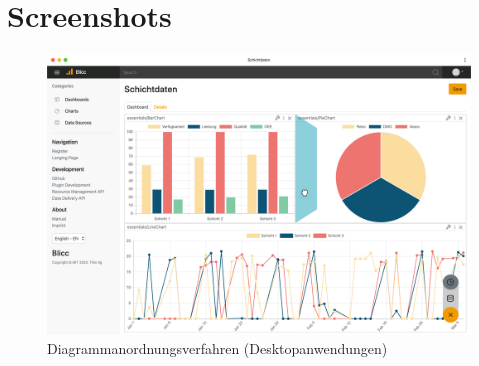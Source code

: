 \chapter{Screenshots}
\label{chap:screenshots}

\begin{figure}[h]
    \centering
    \includegraphics[scale=0.14]{img/desktop/Desktop}
    \caption{Diagrammanordnungsverfahren (Desktopanwendungen)}
    \label{figure:positionierungeinesneuendiagramms}
\end{figure}

